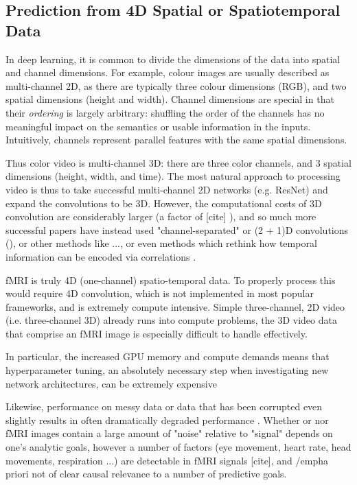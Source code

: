 \documentclass[10pt]{article}
\begin{document}
\subsection{Prediction from 4D Spatial or Spatiotemporal Data}

In deep learning, it is common to divide the dimensions of the data into spatial and channel
dimensions. For example, colour images are usually described as multi-channel 2D, as there are
typically three colour dimensions (RGB), and two spatial dimensions (height and width). Channel
dimensions are special in that their \emph{ordering} is largely arbitrary: shuffling the order of
the channels has no meaningful impact on the semantics or usable information in the inputs.
Intuitively, channels represent parallel features with the same spatial dimensions.

Thus color video is multi-channel 3D: there are three color channels, and 3 spatial dimensions
(height, width, and time). The most natural approach to processing video is thus to take successful
multi-channel 2D networks (e.g. ResNet) and expand the convolutions to be 3D. However, the
computational costs of 3D convolution are considerably larger (a factor of [cite]
\citet{tranCloserLookSpatiotemporal2018}), and so much more successful papers have instead used
"channel-separated" or (2 + 1)D convolutions (\citet{tranCloserLookSpatiotemporal2018}), or other
methods like ..., or even methods which rethink how temporal information can be encoded via
correlations \cite{wangVideoModelingCorrelation2020}.

fMRI is truly 4D (one-channel) spatio-temporal data. To properly process this would require 4D
convolution, which is not implemented in most popular frameworks, and is extremely compute
intensive. Simple three-channel, 2D video (i.e. three-channel 3D) already runs into compute
problems, the 3D video data that comprise an fMRI image is especially difficult to handle
effectively.

In particular, the increased GPU memory and compute demands means that hyperparameter tuning, an
absolutely necessary step when investigating new network architectures, can be extremely expensive


Likewise, performance on messy data or data that has been corrupted even slightly results in often
dramatically degraded performance
\citep{metzUsingLearnedOptimizers2019,dodgeStudyComparisonHuman2017,hendrycksBenchmarkingNeuralNetwork2019,azulayWhyDeepConvolutional2019,rosenfeldElephantRoom2018}.
Whether or nor fMRI images contain a large amount of "noise" relative to "signal" depends on one's
analytic goals, however a number of factors (eye movement, heart rate, head movements, respiration
...) are detectable in fMRI signals [cite], and /emph{a priori} not of clear causal relevance to a
number of predictive goals.
\end{document}
